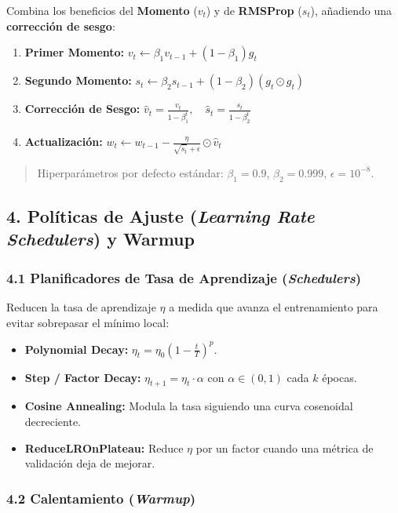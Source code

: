 Combina los beneficios del \textbf{Momento} ($v_t$) y de \textbf{RMSProp} ($s_t$), añadiendo una \textbf{corrección de sesgo}:

\begin{enumerate}
	\item \textbf{Primer Momento:} $v_t \leftarrow \beta_1 v_{t-1} + (1 - \beta_1) g_t$
	\item \textbf{Segundo Momento:} $s_t \leftarrow \beta_2 s_{t-1} + (1 - \beta_2) (g_t \odot g_t)$
	\item \textbf{Corrección de Sesgo:} $\hat{v}_t = \frac{v_t}{1 - \beta_1^t}, \quad \hat{s}_t = \frac{s_t}{1 - \beta_2^t}$
	\item \textbf{Actualización:} $w_t \leftarrow w_{t-1} - \frac{\eta}{\sqrt{\hat{s}_t} + \epsilon} \odot \hat{v}_t$
\end{enumerate}

\begin{quote}
	Hiperparámetros por defecto estándar: $\beta_1 = 0.9$, $\beta_2 = 0.999$, $\epsilon = 10^{-8}$.
\end{quote}

\subsection{4. Políticas de Ajuste (\emph{Learning Rate Schedulers}) y Warmup}

\subsubsection{4.1 Planificadores de Tasa de Aprendizaje (\emph{Schedulers})}

Reducen la tasa de aprendizaje $\eta$ a medida que avanza el entrenamiento para evitar sobrepasar el mínimo local:
\begin{itemize}
	\item \textbf{Polynomial Decay:} $\eta_t = \eta_0 \left(1 - \frac{t}{T}\right)^p$.
	\item \textbf{Step / Factor Decay:} $\eta_{t+1} = \eta_t \cdot \alpha$ con $\alpha \in (0, 1)$ cada $k$ épocas.
	\item \textbf{Cosine Annealing:} Modula la tasa siguiendo una curva cosenoidal decreciente.
	\item \textbf{ReduceLROnPlateau:} Reduce $\eta$ por un factor cuando una métrica de validación deja de mejorar.
\end{itemize}

\subsubsection{4.2 Calentamiento (\emph{Warmup})}

